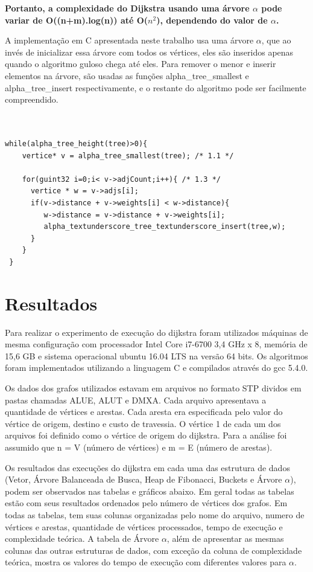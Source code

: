 \documentclass[
	12pt,				%
	oneside,			%
	a4paper,			%
	english,			%
	french,				%
	spanish,			%
	brazil,				%
	]{abntex2}
\begin{document}
\textbf{Portanto, a complexidade do Dijkstra usando uma árvore $\alpha$ pode variar de O((n+m).log(n)) até O($n^2$), dependendo do valor de $\alpha$.}

A implementação em C apresentada neste trabalho usa uma árvore $\alpha$, que ao invés de
inicializar essa árvore com todos os vértices, eles são inseridos apenas quando o algoritmo
guloso chega até eles. Para remover o menor e inserir elementos na árvore, são usadas as
funções alpha\_tree\_smallest e alpha\_tree\_insert respectivamente, e o restante do
algoritmo pode ser facilmente compreendido.
\\
\\
\\
\begin{lstlisting}[caption=Corpo do algortimo Dijkstra com uso da árvore $\alpha$, label=dijkstra.alpha]
 while(alpha_tree_height(tree)>0){
    vertice* v = alpha_tree_smallest(tree); /* 1.1 */
      
    for(guint32 i=0;i< v->adjCount;i++){ /* 1.3 */
      vertice * w = v->adjs[i];
      if(v->distance + v->weights[i] < w->distance){
         w->distance = v->distance + v->weights[i];   
         alpha_textunderscore_tree_textunderscore_insert(tree,w);
      } 
    }
 } 
\end{lstlisting}

\chapter{Resultados}
Para realizar o experimento de execução do dijkstra foram utilizados máquinas de mesma configuração com processador Intel Core i7-6700 3,4 GHz x 8, memória de 15,6 GB e sistema operacional ubuntu 16.04 LTS na versão 64 bits. Os algoritmos foram implementados utilizando a linguagem C e compilados através do gcc 5.4.0.

Os dados dos grafos utilizados estavam em arquivos no formato STP dividos em pastas chamadas ALUE, ALUT e DMXA. Cada arquivo apresentava a quantidade de vértices e arestas. Cada aresta era especificada pelo valor do vértice de origem, destino e custo de travessia. O vértice \textsf{1} de cada um dos arquivos foi definido como o vértice de origem do dijkstra. Para a análise foi assumido que n = V (número de vértices)  e m = E (número de arestas). 

Os resultados das execuções do dijkstra em cada uma das estrutura de dados (Vetor, Árvore Balanceada de Busca, Heap de Fibonacci, Buckets e Árvore $\alpha$), podem ser observados nas tabelas e gráficos abaixo. Em geral todas as tabelas estão com seus resultados ordenados pelo número de vértices dos grafos. Em todas as tabelas, tem suas colunas organizadas pelo nome do arquivo, numero de vértices e arestas, quantidade de vértices processados, tempo de execução e complexidade teórica. A tabela de Árvore $\alpha$, além de apresentar as mesmas colunas das outras estruturas de dados, com exceção da coluna de complexidade teórica, mostra os valores do tempo de execução com diferentes valores para $\alpha$. \\
\end{document}
